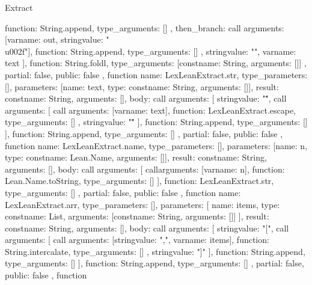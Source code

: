 \begin{lexlean}{Extract}
\begin{toolingmodule}
{{{{{{{                  function: String.append,
                  type_arguments: []
                }
              },
              then_branch: call{
                arguments: [var{name: out}, string{value: "\\u002f"}],
                function: String.append,
                type_arguments: []
              }
            }
          },
          string{value: ""},
          var{name: text}
        ],
        function: String.foldl,
        type_arguments: [const{name: String, arguments: []}]
      },
      partial: false,
      public: false
    },
    function{
      name: LexLeanExtract.str,
      type_parameters: [],
      parameters: [{name: text, type: const{name: String, arguments: []}}],
      result: const{name: String, arguments: []},
      body: call{
        arguments: [
          string{value: "\""},
          call{
            arguments: [
              call{
                arguments: [var{name: text}],
                function: LexLeanExtract.escape,
                type_arguments: []
              },
              string{value: "\""}
            ],
            function: String.append,
            type_arguments: []
          }
        ],
        function: String.append,
        type_arguments: []
      },
      partial: false,
      public: false
    },
    function{
      name: LexLeanExtract.name,
      type_parameters: [],
      parameters: [{name: n, type: const{name: Lean.Name, arguments: []}}],
      result: const{name: String, arguments: []},
      body: call{
        arguments: [
          call{arguments: [var{name: n}], function: Lean.Name.toString, type_arguments: []}
        ],
        function: LexLeanExtract.str,
        type_arguments: []
      },
      partial: false,
      public: false
    },
    function{
      name: LexLeanExtract.arr,
      type_parameters: [],
      parameters: [
        {name: items, type: const{name: List, arguments: [const{name: String, arguments: []}]}}
      ],
      result: const{name: String, arguments: []},
      body: call{
        arguments: [
          string{value: "["},
          call{
            arguments: [
              call{
                arguments: [string{value: ","}, var{name: items}],
                function: String.intercalate,
                type_arguments: []
              },
              string{value: "]"}
            ],
            function: String.append,
            type_arguments: []
          }
        ],
        function: String.append,
        type_arguments: []
      },
      partial: false,
      public: false
    },
    function{
}}
\end{toolingmodule}
\end{lexlean}
